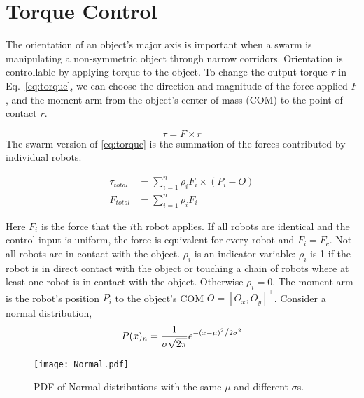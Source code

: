 \section{Torque Control}
\label{sec:theory}


The orientation of an object's major axis is important when a swarm is manipulating a non-symmetric object through narrow corridors. 
Orientation is controllable by applying torque to the object. 
To change the output torque $\tau$ in Eq.~\eqref{eq:torque}, we can choose the direction and magnitude of the force applied $F$, and the moment arm from the object's center of mass (COM) to the point of contact $r$.

\begin{equation}
\tau = F \times r\label{eq:torque}
\end{equation}
The swarm version of \eqref{eq:torque} is the summation of the forces contributed by individual robots.

\begin{align}
\tau_{total} &= \sum\limits_{i=1}^n \rho_i F_i \times (P_i - O )   \label{eq:swarmtorque}\\
F_{total} &= \sum\limits_{i=1}^n \rho_i F_i  \label{eq:swarmforce}
\end{align}

Here $F_i$ is the force that the $i$th robot applies.  If all robots are identical and the control input is uniform, the force is equivalent for every robot and $F_i = F_c$.
Not all robots are in contact with the object.  $\rho_i$ is an indicator variable: $\rho_i$ is 1 if the robot is in direct contact with the object or touching a chain of robots where at least one robot is in contact with the object. Otherwise $\rho_i = 0$.
The moment arm is the robot's position $P_i$ to the object's COM $O=[O_x,O_y]^{\top}$.
Consider a normal distribution, 
\begin{equation}
P(x)_{n} = \frac{1}{{\sigma \sqrt {2\pi } }}e^{{{ - \left( {x - \mu } \right)^2 } \mathord{\left/ {\vphantom {{ - \left( {x - \mu } \right)^2 } {2\sigma ^2 }}} \right. \kern-\nulldelimiterspace} {2\sigma ^2 }}}
\end{equation}
\begin{figure}
\begin{center}
	\texttt{[image: Normal.pdf]}
\end{center}
\vspace{-1em}
\caption{\label{fig:pdfNorm}
PDF of Normal distributions with the same $\mu$ and different $\sigma$s.
}
\vspace{-1em}
\end{figure}


